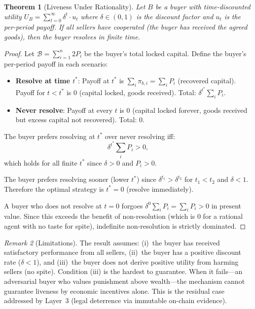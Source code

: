 \documentclass[11pt,a4paper]{article}
\newtheorem{theorem}{Theorem}[section]
\theoremstyle{definition}
\theoremstyle{remark}
\newtheorem{remark}[theorem]{Remark}
\newcommand{\pay}{P}           %
\begin{document}
\begin{theorem}[Liveness Under Rationality]
\label{thm:liveness}
Let $B$ be a buyer with time-discounted utility
$U_B = \sum_{t=0}^{\infty} \delta^t \cdot u_t$ where $\delta \in (0, 1)$
is the discount factor and $u_t$ is the per-period payoff. If all
sellers have cooperated (the buyer has received the agreed goods), then
the buyer resolves in finite time.
\end{theorem}

\begin{proof}
Let $\mathcal{B} = \sum_{i=1}^{n} 2\pay_i$ be the buyer's total
locked capital. Define the buyer's per-period payoff in each scenario:
\begin{itemize}
  \item \textbf{Resolve at time $t^*$}: Payoff at $t^*$ is
    $\sum_i \pi_{b,i} = \sum_i \pay_i$ (recovered capital).
    Payoff for $t < t^*$ is $0$ (capital locked, goods received).
    Total: $\delta^{t^*} \sum_i \pay_i$.
  \item \textbf{Never resolve}: Payoff at every $t$ is $0$ (capital
    locked forever, goods received but excess capital not recovered).
    Total: $0$.
\end{itemize}

The buyer prefers resolving at $t^*$ over never resolving iff:
\begin{equation}
  \delta^{t^*} \sum_i \pay_i > 0,
  \label{eq:liveness-condition}
\end{equation}
which holds for all finite $t^*$ since $\delta > 0$ and $\pay_i > 0$.

The buyer prefers resolving sooner (lower $t^*$) since
$\delta^{t_1} > \delta^{t_2}$ for $t_1 < t_2$ and $\delta < 1$.
Therefore the optimal strategy is $t^* = 0$ (resolve immediately).

A buyer who does not resolve at $t = 0$ forgoes
$\delta^0 \sum_i \pay_i = \sum_i \pay_i > 0$ in present value.
Since this exceeds the benefit of non-resolution (which is $0$ for
a rational agent with no taste for spite), indefinite non-resolution
is strictly dominated.
\end{proof}

\begin{remark}[Limitations]
\label{rem:liveness-limitations}
The result assumes: (i)~the buyer has received satisfactory performance
from all sellers, (ii)~the buyer has a positive discount rate
($\delta < 1$), and (iii)~the buyer does not derive positive utility
from harming sellers (no spite). Condition (iii) is the hardest to
guarantee. When it fails---an adversarial buyer who values
punishment above wealth---the mechanism cannot guarantee liveness
by economic incentives alone. This is the residual case addressed by
Layer~3 (legal deterrence via immutable on-chain evidence).
\end{remark}
\end{document}
